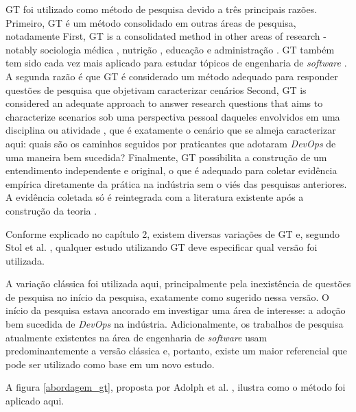 \acrshort{GT} foi utilizado como método de pesquisa devido a três principais
razões. Primeiro, \acrshort{GT} é um método consolidado em outras áreas de
pesquisa, notadamente First, GT is a consolidated method in other areas of research -
notably sociologia médica \cite{}, nutrição \cite{}, educação \cite{} e
administração \cite{}. \acrshort{GT} também tem sido cada vez mais aplicado
para estudar tópicos de engenharia de \textit{software} \cite{}. A segunda
razão é que \acrshort{GT} é considerado um método adequado para responder
questões de pesquisa que objetivam caracterizar cenários Second, GT is considered
an adequate approach to answer research questions that aims to
characterize scenarios sob uma perspectiva pessoal daqueles envolvidos em uma
disciplina ou atividade \cite{gt_software_eng}, que é exatamente o cenário que
se almeja caracterizar aqui: quais são os caminhos seguidos por praticantes que
adotaram \textit{DevOps} de uma maneira bem sucedida? Finalmente, \acrshort{GT}
possibilita a construção de um entendimento independente e original, o que é
adequado para coletar evidência empírica diretamente da prática na indústria
sem o viés das pesquisas anteriores. A evidência coletada só é reintegrada com
a literatura existente após a construção da teoria \cite{}.

Conforme explicado no capítulo 2, existem diversas variações de \acrshort{GT} e,
segundo Stol et al. \cite{}, qualquer estudo utilizando \acrshort{GT} deve
especificar qual versão foi utilizada.

A variação clássica foi utilizada aqui, principalmente pela inexistência de
questões de pesquisa no início da pesquisa, exatamente como sugerido nessa
versão. O início da pesquisa estava ancorado em investigar uma área de
interesse: a adoção bem sucedida de \textit{DevOps} na indústria.
Adicionalmente, os trabalhos de pesquisa atualmente existentes na área
de engenharia de \textit{software} usam predominantemente a versão clássica
\cite{} e, portanto, existe um maior referencial que pode ser utilizado
como base em um novo estudo.

A figura \ref{abordagem_gt}, proposta por Adolph et al. \cite{using_gt_adolph},
ilustra como o método foi aplicado aqui.

%
